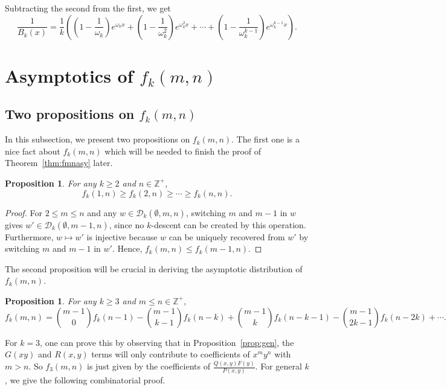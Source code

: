 \documentclass{amsart}
\newtheorem{proposition}[theorem]{Proposition}
\theoremstyle{definition}
\begin{document}
Subtracting the second from the first, we get
\[\frac{1}{B_k(x)}=\frac{1}{k}\left(\left(1-\frac{1}{\omega_k}\right)e^{\omega_k x}+\left(1-\frac{1}{\omega_k^2}\right)e^{\omega_k^2 x}+\cdots+\left(1-\frac{1}{\omega_k^{k-1}}\right)e^{\omega_k^{k-1}x}\right).\]

\section{Asymptotics of $f_k(m,n)$}\label{sec:mnasy}

\subsection{Two propositions on $f_k(m,n)$}
In this subsection, we present two propositions on $f_k(m,n)$. The first one is a nice fact about $f_k(m,n)$ which will be needed to finish the proof of Theorem~\ref{thm:fmnasy} later.

\begin{proposition}\label{prop:decr}
For any $k\geq 2$ and $n\in \mathbb{Z}^+$,
\[f_k(1,n)\geq f_k(2,n)\geq \cdots \geq f_k(n,n).\]
\end{proposition}

\begin{proof}
For $2\leq m\leq n$ and any $w\in \mathcal{D}_k(\emptyset,m,n)$, switching $m$ and $m-1$ in $w$ gives $w'\in \mathcal{D}_k(\emptyset,m-1,n)$, since no $k$-descent can be created by this operation. Furthermore, $w\mapsto w'$ is injective because $w$ can be uniquely recovered from $w'$ by switching $m$ and $m-1$ in $w'$. Hence, $f_k(m,n)\leq f_k(m-1,n)$.
\end{proof}

The second proposition will be crucial in deriving the asymptotic distribution of $f_k(m,n)$.

\begin{proposition}\label{prop:fmn}
For any $k\geq 3$ and $m\leq n\in \mathbb{Z}^+$,
\[f_k(m,n)=\binom{m-1}{0}f_k(n-1)-\binom{m-1}{k-1}f_k(n-k)+\binom{m-1}{k}f_k(n-k-1)-\binom{m-1}{2k-1}f_k(n-2k)+\cdots.\]
\end{proposition}


For $k=3$, one can prove this by observing that in Proposition~\ref{prop:gen}, the $G(xy)$ and $R(x,y)$ terms will only contribute to coefficients of $x^m y^n$ with $m>n$. So $f_3(m,n)$ is just given by the coefficients of $\frac{Q(x,y)F(y)}{P(x,y)}$. For general $k$, we give the following combinatorial proof.
\end{document}
